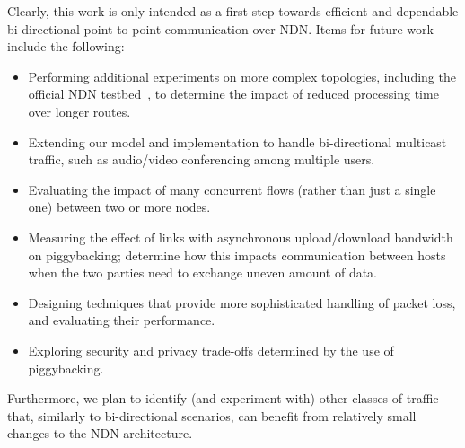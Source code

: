 \documentclass[conference]{IEEEtran}
\begin{document}
Clearly, this work is only intended as a first step towards efficient and dependable bi-directional point-to-point communication over NDN. Items for future work include the following:
\begin{itemize}

\item Performing additional experiments on more complex topologies, including the official NDN testbed~\cite{ndn-testbed}, to determine the impact of reduced processing time over longer routes.

\item Extending our model and implementation to handle bi-directional multicast traffic, such as audio/video conferencing among multiple users.

\item Evaluating the impact of many concurrent flows (rather than just a single one) between two or more nodes.

\item Measuring the effect of links with asynchronous upload/download bandwidth on piggybacking; determine how this impacts communication between hosts when the two parties need to exchange uneven amount of data.

\item Designing techniques that provide more sophisticated handling of packet loss, and  evaluating their  performance.

\item Exploring security and privacy trade-offs determined by the use of piggybacking.

\end{itemize}
Furthermore, we plan to identify (and experiment with) 
other classes of traffic that, similarly to bi-directional scenarios, 
can benefit from relatively small changes to the NDN architecture.





\end{document}
